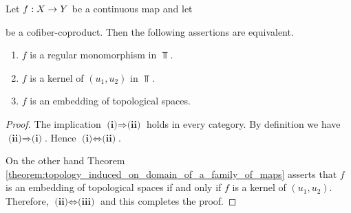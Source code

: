 \begin{proposition}\label{proposition:regular_monomorphisms_are_embeddings}
	Let $f:X\rightarrow Y$ be a continuous map and let
	\begin{center}
	\end{center}
	be a cofiber-coproduct. Then the following assertions are equivalent.
	\begin{enumerate}[label=\emph{\textbf{(\roman*)}}, leftmargin=3.0em]
		\item $f$ is a regular monomorphism in $\Top$.
		\item $f$ is a kernel of $(u_1,u_2)$ in $\Top$.
		\item $f$ is an embedding of topological spaces.
	\end{enumerate}
\end{proposition}
\begin{proof}
	The implication $\textbf{(i)} \Rightarrow \textbf{(ii)}$ holds in every category. By definition we have $\textbf{(ii)} \Rightarrow \textbf{(i)}$. Hence $\textbf{(i)}\Leftrightarrow \textbf{(ii)}$.

	On the other hand Theorem \ref{theorem:topology_induced_on_domain_of_a_family_of_maps} asserts that $f$ is an embedding of topological spaces if and only if $f$ is a kernel of $(u_1,u_2)$. Therefore, $\textbf{(ii)}\Leftrightarrow \textbf{(iii)}$ and this completes the proof.
\end{proof}

